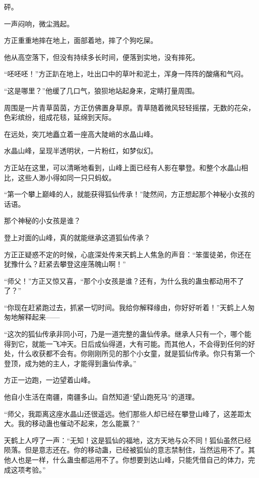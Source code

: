 
\begin{this_body}



砰。

一声闷响，微尘溅起。

方正重重地摔在地上，面部着地，摔了个狗吃屎。

他从高空落下，但没有持续多长时间，便落到实地，没有摔死。

“呸呸呸！”方正趴在地上，吐出口中的草叶和泥土，浑身一阵阵的酸痛和气闷。

“这是哪里？”他缓了几口气，狼狈地站起身来，定睛打量周围。

周围是一片青草茵茵，方正仿佛置身草原。青草随着微风轻轻摇摆，无数的花朵，色彩缤纷，组成花毯，延绵到天际。

在远处，突兀地矗立着一座高大陡峭的水晶山峰。

水晶山峰，呈现半透明状，一片粉红，如梦似幻。

方正站在这里，可以清晰地看到，山峰上面已经有人影在攀登。和整个水晶山相比，这些人渺小得如同一只只蚂蚁。

“第一个攀上巅峰的人，就能获得狐仙传承！”陡然间，方正想起那个神秘小女孩的话语。

那个神秘的小女孩是谁？

登上对面的山峰，真的就能继承这道狐仙传承？

方正正疑惑不定的时候，心底深处传来天鹤上人焦急的声音：“笨蛋徒弟，你还在犹豫什么？赶紧去攀登这座荡魄山啊！”

“师父！”方正又惊又喜，“那个小女孩是谁？还有，为什么我的蛊虫都动用不了了？”

“你现在赶紧跑过去，抓紧一切时间。我给你解释缘由，你好好听着！”天鹤上人匆匆地解释起来——

“这次的狐仙传承非同小可，乃是一道完整的蛊仙传承。继承人只有一个，哪个能得到它，就能一飞冲天。日后成仙得道，大有可能。而其他人，不会得到任何的好处，什么收获都不会有。你刚刚所见的那个小女童，就是狐仙传承。你只有第一个登顶，成为她的主人，才能得到蛊仙传承。”

方正一边跑，一边望着山峰。

他自小生活在南疆，南疆多山。自然知道“望山跑死马”的道理。

“师父，我距离这座水晶山还很遥远。他们那些人却已经在攀登山峰了，这差距太大。我的移动蛊也催动不起来，怎么能赢？”

天鹤上人哼了一声：“无知！这是狐仙的福地，这方天地与众不同！狐仙虽然已经陨落。但是意志还在。你的移动蛊，已经被狐仙的意志禁制住，当然运用不了。其他人也是一样，什么蛊虫都运用不了。你想要到达山峰，只能凭借自己的体力，完成这项考验。”


\end{this_body}
